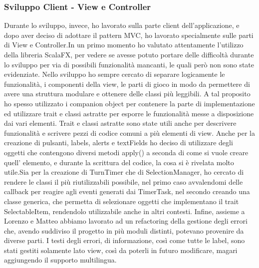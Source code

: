 \subsubsection{Sviluppo Client - View e Controller}
Durante lo sviluppo, invece, ho lavorato sulla parte client dell’applicazione, e dopo aver deciso di adottare il pattern MVC, ho lavorato specialmente sulle parti di View e Controller.\newline \newline In un primo momento ho valutato attentamente l’utilizzo della libreria ScalaFX, per vedere se avesse potuto portare delle difficoltà durante lo sviluppo per via di possibili funzionalità mancanti, le quali però non sono state evidenziate. \newline \newline Nello sviluppo ho sempre cercato di separare logicamente le funzionalità, i componenti della view, le parti di gioco in modo da permettere di avere una struttura modulare e ottenere delle classi più leggibili. A tal proposito ho spesso utilizzato i companion object per contenere la parte di implementazione ed utilizzare trait e classi astratte per esporre le funzionalità messe a disposizione dai vari elementi. Trait e classi astratte sono state utili anche per descrivere funzionalità e scrivere pezzi di codice comuni a più elementi di view. \newline \newline Anche per la creazione di pulsanti, labels, alerts e textFields ho deciso di utilizzare degli oggetti che contengono diversi metodi apply() a seconda di come si vuole creare quell’ elemento, e durante la scrittura del codice, la cosa si è rivelata molto utile.\newline \newline Sia per la creazione di TurnTimer che di SelectionManager, ho cercato di rendere le classi il più riutilizzabili possibile, nel primo caso avvalendomi delle callback per reagire agli eventi generati dai TimerTask, nel secondo creando una classe generica, che permetta di selezionare oggetti che implementano il trait SelectableItem, rendendolo utilizzabile anche in altri contesti.
\newline \newline Infine, assieme a Lorenzo e Matteo abbiamo lavorato ad un refactoring della gestione degli errori che, avendo suddiviso il progetto in più moduli distinti, potevano provenire da diverse parti. I testi degli errori, di informazione, così come tutte le label, sono stati gestiti solamente lato view, così da poterli in futuro modificare, magari aggiungendo il supporto multilingua.
